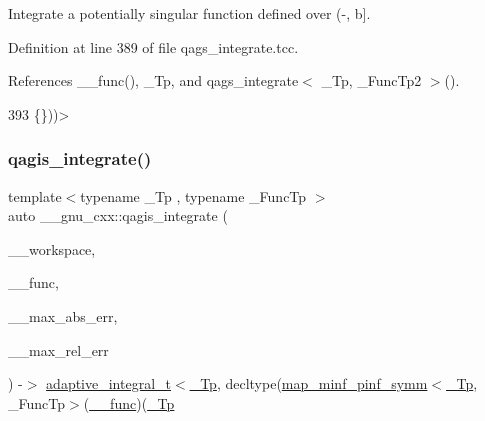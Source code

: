 Integrate a potentially singular function defined over (-\/, b\mbox{]}. 

Definition at line 389 of file qags\+\_\+integrate.\+tcc.



References \+\_\+\+\_\+func(), \+\_\+\+Tp, and qags\+\_\+integrate$<$ \+\_\+\+Tp, \+\_\+\+Func\+Tp2 $>$().


\begin{DoxyCode}
393                                                                                       \{\}))>
\end{DoxyCode}
\mbox{\label{namespace____gnu__cxx_a7c2c57e5fc096155130cb44c4dacdd23}} 
\subsubsection{\texorpdfstring{qagis\+\_\+integrate()}{qagis\_integrate()}}
{\footnotesize\ttfamily template$<$typename \+\_\+\+Tp , typename \+\_\+\+Func\+Tp $>$ \\
auto \+\_\+\+\_\+gnu\+\_\+cxx\+::qagis\+\_\+integrate (\begin{DoxyParamCaption}\item[{\hyperlink{class____gnu__cxx_1_1integration__workspace}{integration\+\_\+workspace}$<$ \hyperlink{namespace____gnu__cxx_a3b19a9c800ca194374ef9172290f7d79}{\+\_\+\+Tp}, std\+::invoke\+\_\+result\+\_\+t$<$ \+\_\+\+Func\+Tp, \hyperlink{namespace____gnu__cxx_a3b19a9c800ca194374ef9172290f7d79}{\+\_\+\+Tp} $>$$>$ \&}]{\+\_\+\+\_\+workspace,  }\item[{\+\_\+\+Func\+Tp}]{\+\_\+\+\_\+func,  }\item[{\hyperlink{namespace____gnu__cxx_a3b19a9c800ca194374ef9172290f7d79}{\+\_\+\+Tp}}]{\+\_\+\+\_\+max\+\_\+abs\+\_\+err,  }\item[{\hyperlink{namespace____gnu__cxx_a3b19a9c800ca194374ef9172290f7d79}{\+\_\+\+Tp}}]{\+\_\+\+\_\+max\+\_\+rel\+\_\+err }\end{DoxyParamCaption}) -\/$>$ \hyperlink{struct____gnu__cxx_1_1adaptive__integral__t}{adaptive\+\_\+integral\+\_\+t}$<$\hyperlink{namespace____gnu__cxx_a3b19a9c800ca194374ef9172290f7d79}{\+\_\+\+Tp}, decltype(\hyperlink{struct____gnu__cxx_1_1map__minf__pinf__symm}{map\+\_\+minf\+\_\+pinf\+\_\+symm}$<$\hyperlink{namespace____gnu__cxx_a3b19a9c800ca194374ef9172290f7d79}{\+\_\+\+Tp}, \+\_\+\+Func\+Tp$>$(\hyperlink{namespace____gnu__cxx_af2b2f0c7a2ae72b922b1afefae5a65b2}{\+\_\+\+\_\+func})(\hyperlink{namespace____gnu__cxx_a3b19a9c800ca194374ef9172290f7d79}{\+\_\+\+Tp}}

